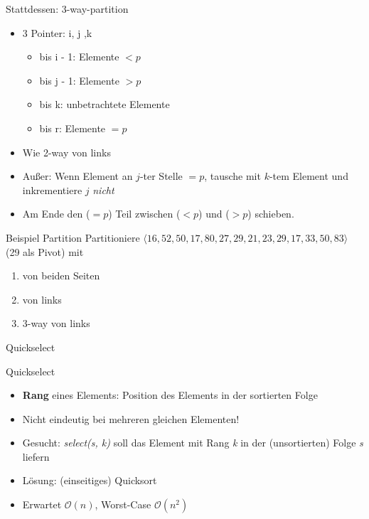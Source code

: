 \begin{frame}{Stattdessen: 3-way-partition}
	\begin{itemize}
		\item 3 Pointer: i, j ,k
			\begin{itemize}
				\item bis i - 1: Elemente $< p$
				\item bis j - 1: Elemente $> p$
				\item bis k: unbetrachtete Elemente
				\item bis r: Elemente $= p$
			\end{itemize}
		\item Wie 2-way von links
		\item Außer: Wenn Element an $j$-ter Stelle $= p$, tausche mit $k$-tem Element und inkrementiere $j$ \emph{nicht}
		\item Am Ende den ($ = p$) Teil zwischen ($< p$) und ($> p$) schieben.
	\end{itemize}

\end{frame}


\begin{frame}{Beispiel Partition}
	Partitioniere \(\langle 16, 52, 50, 17, 80, 27, 29, 21, 23, 29, 17, 33, 50, 83 \rangle\) (29 als Pivot) mit

	\begin{enumerate}
		\item von beiden Seiten
		\item von links
		\item 3-way von links
	\end{enumerate}
\end{frame}

\begin{frame}
	\begin{center}
		\Huge
		Quickselect
	\end{center}
\end{frame}

\begin{frame}{Quickselect}
	\begin{itemize}
		\item \textbf{Rang} eines Elements: Position des Elements in der sortierten Folge
		\item Nicht eindeutig bei mehreren gleichen Elementen!
		\item Gesucht: \emph{select(s, k)} soll das Element mit Rang \emph{k} in der (unsortierten) Folge \emph{s} liefern
		\item Lösung: (einseitiges) Quicksort
		\item Erwartet \(\mathcal{O}(n)\), Worst-Case \(\mathcal{O}(n^2)\)
	\end{itemize}
\end{frame}

